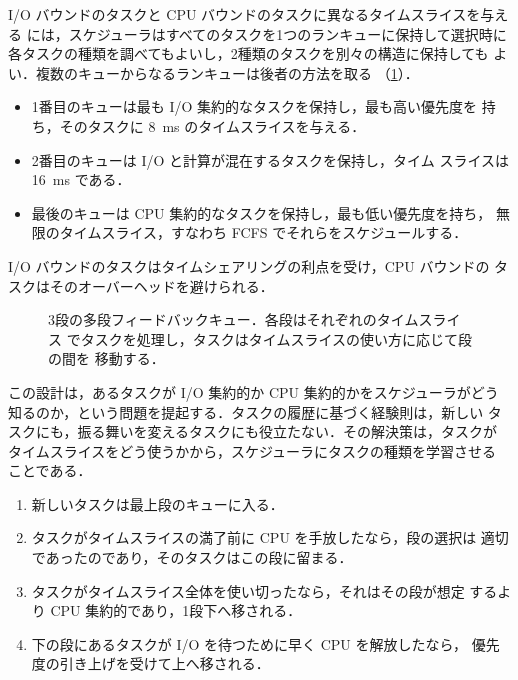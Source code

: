 \documentclass[../main.tex]{subfiles}
\begin{document}
I/O バウンドのタスクと CPU バウンドのタスクに異なるタイムスライスを与える
には，スケジューラはすべてのタスクを1つのランキューに保持して選択時に
各タスクの種類を調べてもよいし，2種類のタスクを別々の構造に保持しても
よい．複数のキューからなるランキューは後者の方法を取る
（\cref{fig:l07-mlfq}）．
\begin{itemize}
  \item 1番目のキューは最も I/O 集約的なタスクを保持し，最も高い優先度を
    持ち，そのタスクに \SI{8}{\milli\second} のタイムスライスを与える．
  \item 2番目のキューは I/O と計算が混在するタスクを保持し，タイム
    スライスは \SI{16}{\milli\second} である．
  \item 最後のキューは CPU 集約的なタスクを保持し，最も低い優先度を持ち，
    無限のタイムスライス，すなわち FCFS でそれらをスケジュールする．
\end{itemize}
I/O バウンドのタスクはタイムシェアリングの利点を受け，CPU バウンドの
タスクはそのオーバーヘッドを避けられる．

\begin{figure}[htbp]
  \centering
  
  \caption{3段の多段フィードバックキュー．各段はそれぞれのタイムスライス
    でタスクを処理し，タスクはタイムスライスの使い方に応じて段の間を
    移動する．}
  \label{fig:l07-mlfq}
\end{figure}

この設計は，あるタスクが I/O 集約的か CPU 集約的かをスケジューラがどう
知るのか，という問題を提起する．タスクの履歴に基づく経験則は，新しい
タスクにも，振る舞いを変えるタスクにも役立たない．その解決策は，タスクが
タイムスライスをどう使うかから，スケジューラにタスクの種類を学習させる
ことである．
\begin{enumerate}
  \item 新しいタスクは最上段のキューに入る．
  \item タスクがタイムスライスの満了前に CPU を手放したなら，段の選択は
    適切であったのであり，そのタスクはこの段に留まる．
  \item タスクがタイムスライス全体を使い切ったなら，それはその段が想定
    するより CPU 集約的であり，1段下へ移される．
  \item 下の段にあるタスクが I/O を待つために早く CPU を解放したなら，
    優先度の引き上げを受けて上へ移される．
\end{enumerate}
\end{document}
